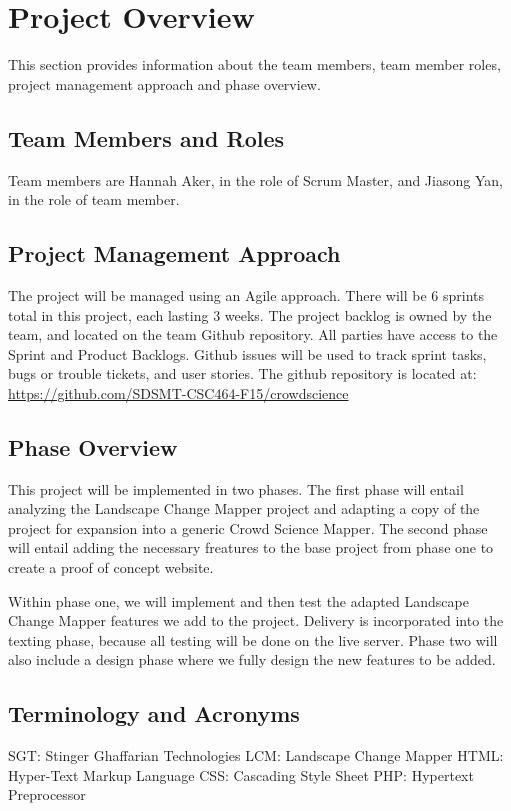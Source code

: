 

\chapter{Project Overview}
This section provides information about the team members, team member roles, project management approach and phase overview.



\section{Team Members and Roles}
Team members are Hannah Aker, in the role of Scrum Master, and Jiasong Yan, in the role of team member.


\section{Project  Management Approach}
The project will be managed using an Agile approach.  There will be 6 sprints total in this project, each lasting 3 weeks. The project backlog is owned by the team, and located on the team Github repository. All parties have access to the Sprint and Product Backlogs. Github issues will be used to track sprint tasks, bugs or trouble tickets, and user stories. The github repository is located at: \url{https://github.com/SDSMT-CSC464-F15/crowdscience} 

\section{Phase  Overview}
This project will be implemented in two phases. The first phase will entail analyzing the Landscape Change Mapper project and adapting a copy of the project for expansion into a generic Crowd Science Mapper. The  second phase will entail adding the necessary freatures to the base project from phase one to create a proof of concept website.

Within phase one, we will implement and then test the adapted Landscape Change Mapper features we add to the project. Delivery is incorporated into the texting phase, because all testing will be done on the live server. Phase two will also include a design phase where we fully design the new features to be added.

\section{Terminology and Acronyms}
SGT: Stinger Ghaffarian Technologies
LCM: Landscape Change Mapper
HTML: Hyper-Text Markup Language
CSS: Cascading Style Sheet
PHP: Hypertext Preprocessor